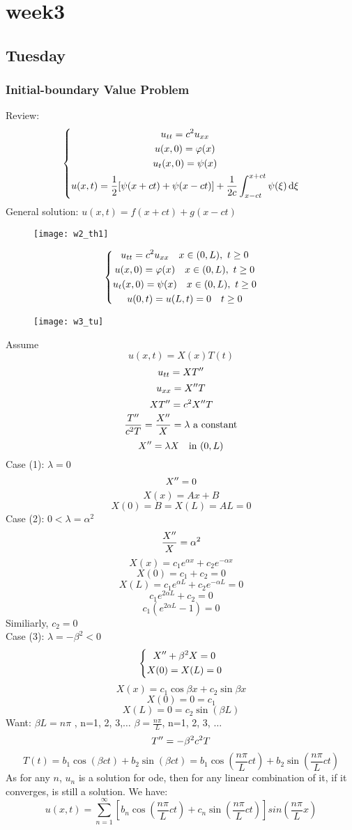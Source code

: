 


\chapter{week3}

\section{Tuesday}
\subsection{Initial-boundary Value Problem}
Review:
\[\left\{\begin{gathered}u_{tt}=c^2u_{xx}\\u(x,0)=\varphi(x)\\u_t(x,0)=\psi(x)\\u(x,t)=\frac{1}{2}[\psi(x+ct)+\psi(x-ct)]+\frac{1}{2c}\int_{x-ct}^{x+ct}\psi(\xi)\,\mathrm{d} \xi\end{gathered}\right.
\]
General solution: $u(x,t)=f(x+ct)+g(x-ct)$
\begin{figure}[H]
\centering
\texttt{[image: w2\_th1]}
\end{figure}

\[\left\{\begin{gathered}u_{tt}=c^2u_{xx}\quad x\in(0,L),~t\geq0\\
u(x,0)=\varphi(x)\quad x\in(0,L),~t\geq0\\
u_t(x,0)=\psi(x)\quad x\in(0,L),~t\geq0\\
u(0,t)=u(L,t)=0 \quad t\geq0\end{gathered}\right.
\]
\begin{figure}[H]
\centering
\texttt{[image: w3\_tu]}
\end{figure}

Assume
\[u(x,t)=X(x)T(t)
\]
\[u_{tt}=XT^{\prime\prime}
\]
\[u_{xx}=X^{\prime\prime} T
\]
\[XT^{\prime\prime}=c^2X^{\prime\prime} T
\]
\[\frac{T^{\prime\prime}}{c^2T}=\frac{X^{\prime\prime}}{X}=\lambda\text{  a constant}
\]
\[X^{\prime\prime}=\lambda X \quad\text{in } (0,L)
\]
Case (1): $\lambda=0$
\[X^{\prime\prime}=0
\]
\[X(x)=Ax+B
\]
\[X(0)=B=X(L)=AL=0\]
Case (2): $0<\lambda=\alpha^2$
\[\frac{X^{\prime\prime}}{X}=\alpha^2
\]
\[X(x)=c_1e^{\alpha x}+c_2e^{-\alpha x}
\]
\[X(0)=c_1+c_2=0
\]
\[X(L)=c_1e^{\alpha L}+c_2e^{-\alpha L}=0
\]
\[c_1e^{2\alpha L}+c_2=0
\]
\[c_1(e^{2\alpha L}-1)=0
\]
Similiarly, $c_2=0$\\
Case (3): $\lambda=-\beta^2<0$
\[\left\{\begin{gathered}X^{\prime\prime}+\beta^2X=0\\X(0)=X(L)=0\end{gathered}\right.
\]
\[X(x)=c_1\cos\beta x+c_2\sin\beta x
\]
\[X(0)=0=c_1
\]
\[X(L)=0=c_2\sin(\beta L)
\]
Want: $\beta L=n\pi$ , n=1, 2, 3,$\dots$
 $\beta=\frac{n\pi}{L}$, n=1, 2, 3, $\dots$
\[T^{\prime\prime}=-\beta^2c^2T
\]
\[T(t)=b_1\cos(\beta ct)+b_2\sin(\beta ct)=b_1\cos(\frac{n\pi}{L} ct)+b_2\sin(\frac{n\pi}{L} ct)
\]
As for any $n$, $u_n$ is a solution for ode, then for any linear combination of it, if it converges, is still a solution. We have:
\[u(x,t)=\sum_{n=1}^\infty[b_n\cos(\frac{n\pi}{L}ct)+c_n\sin(\frac{n\pi}{L}ct)]sin(\frac{n\pi}{L}x)
\]

